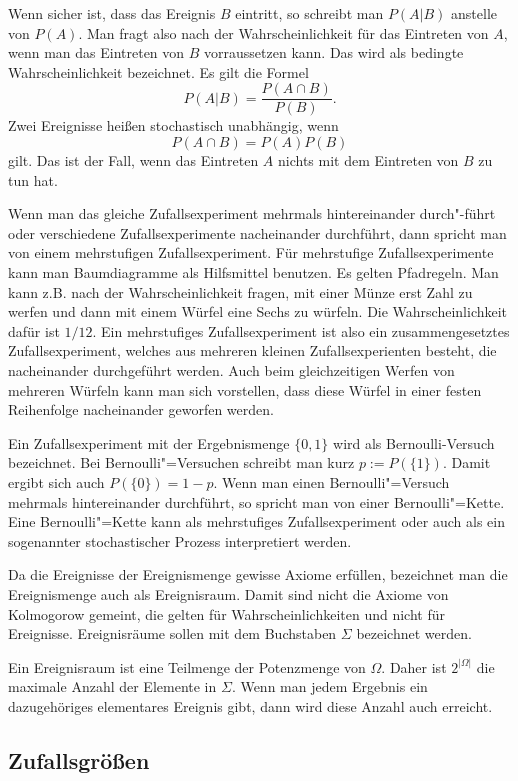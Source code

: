 \documentclass[a4paper,10pt,fleqn,twocolumn,twoside]{article}
\begin{document}
Wenn sicher ist, dass das Ereignis \(B\) eintritt, so schreibt
man \(P(A|B)\) anstelle von \(P(A)\). Man fragt also nach der
Wahrscheinlichkeit für das Eintreten von \(A\), wenn man das Eintreten
von \(B\) vorraussetzen kann. Das wird als bedingte Wahrscheinlichkeit
bezeichnet. Es gilt die Formel
\[P(A|B) = \frac{P(A\cap B)}{P(B)}.\]
Zwei Ereignisse heißen stochastisch unabhängig, wenn
\[P(A\cap B) = P(A)P(B)\]
gilt. Das ist der Fall, wenn das Eintreten \(A\) nichts mit dem
Eintreten von \(B\) zu tun hat.

Wenn man das gleiche Zufallsexperiment mehrmals hintereinander
durch"-führt oder verschiedene Zufallsexperimente nacheinander
durchführt, dann spricht man von einem mehrstufigen
Zufallsexperiment. Für mehrstufige Zufallsexperimente kann man
Baumdiagramme als Hilfsmittel benutzen. Es gelten Pfadregeln.
Man kann z.B. nach der Wahrscheinlichkeit fragen, mit einer Münze
erst Zahl zu werfen und dann mit einem Würfel eine Sechs zu würfeln.
Die Wahrscheinlichkeit dafür ist \(1/12\). Ein mehrstufiges
Zufallsexperiment ist also ein zusammengesetztes Zufallsexperiment,
welches aus mehreren kleinen Zufallsexperienten besteht, die
nacheinander durchgeführt werden. Auch beim gleichzeitigen Werfen
von mehreren Würfeln kann man sich vorstellen, dass diese Würfel
in einer festen Reihenfolge nacheinander geworfen werden.

Ein Zufallsexperiment mit der Ergebnismenge \(\{0,1\}\) wird als
Bernoulli-Versuch bezeichnet. Bei Bernoulli"=Versuchen schreibt man
kurz \(p:=P(\{1\})\). Damit ergibt sich auch \(P(\{0\})=1-p\).
Wenn man einen Bernoulli"=Versuch mehrmals hintereinander durchführt,
so spricht man von einer Bernoulli"=Kette. Eine Bernoulli"=Kette kann
als mehrstufiges Zufallsexperiment oder auch als ein sogenannter
stochastischer Prozess interpretiert werden.

Da die Ereignisse der Ereignismenge gewisse Axiome erfüllen,
bezeichnet man die Ereignismenge auch als Ereignisraum. Damit
sind nicht die Axiome von Kolmogorow gemeint, die gelten für
Wahrscheinlichkeiten und nicht für Ereignisse. Ereignisräume
sollen mit dem Buchstaben \(\Sigma\) bezeichnet werden.

Ein Ereignisraum ist eine Teilmenge der Potenzmenge von \(\Omega\).
Daher ist \(2^{|\Omega|}\) die maximale Anzahl der Elemente in
\(\Sigma\). Wenn man jedem Ergebnis ein dazugehöriges elementares
Ereignis gibt, dann wird diese Anzahl auch erreicht.

\subsection{Zufallsgrößen}
\end{document}
